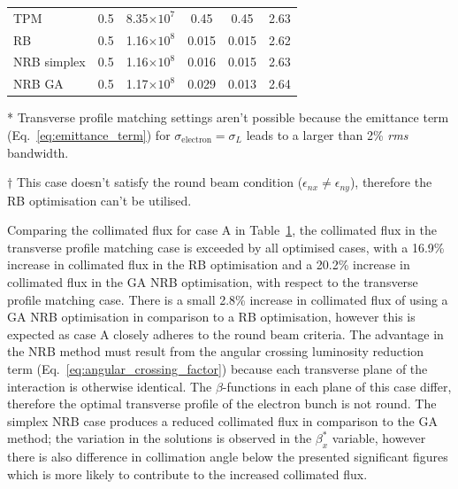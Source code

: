 \documentclass[../main.tex]{subfiles}
\begin{document}
\begin{table}[!h]
{\begin{threeparttable}
\begin{tabular}{lccccc}
\hline
TPM & 0.5 & 8.35$\times 10^{7}$ & 0.45 & 0.45 & 2.63 \\
RB & 0.5 & 1.16$\times 10^{8}$ & 0.015 & 0.015 & 2.62  \\
NRB simplex & 0.5 & 1.16$\times 10^{8}$ & 0.016 & 0.015 & 2.63 \\
NRB GA & 0.5 & 1.17$\times 10^{8}$ & 0.029 & 0.013 & 2.64 \\
\hline\hline
\end{tabular}
\begin{tablenotes}[flushedleft]
\item[*]{Transverse profile matching settings aren't possible because the emittance term (Eq.~\ref{eq:emittance_term}) for $\sigma_{\mathrm{electron}} = \sigma_{L}$ leads to a larger than 2\% \textit{rms} bandwidth.}
\item[$\dagger$]{This case doesn't satisfy the round beam condition ($\epsilon_{nx} \neq \epsilon_{ny}$), therefore the RB optimisation can't be utilised.}
\end{tablenotes}
\end{threeparttable}}
\label{tab:single_point_optimisations}
\end{table}

Comparing the collimated flux for case A in Table~\ref{tab:single_point_optimisations}, the collimated flux in the transverse profile matching case is exceeded by all optimised cases, with a 16.9\% increase in collimated flux in the RB optimisation and a 20.2\% increase in collimated flux in the GA NRB optimisation, with respect to the transverse profile matching case. There is a small 2.8\% increase in collimated flux of using a GA NRB optimisation in comparison to a RB optimisation, however this is expected as case A closely adheres to the round beam criteria. The advantage in the NRB method must result from the angular crossing luminosity reduction term (Eq.~\ref{eq:angular_crossing_factor}) because each transverse plane of the interaction is otherwise identical. The $\beta$-functions in each plane of this case differ, therefore the optimal transverse profile of the electron bunch is not round. The simplex NRB case produces a reduced collimated flux in comparison to the GA method; the variation in the solutions is observed in the $\beta_{x}^{*}$ variable, however there is also difference in collimation angle below the presented significant figures which is more likely to contribute to the increased collimated flux. 
\end{document}
